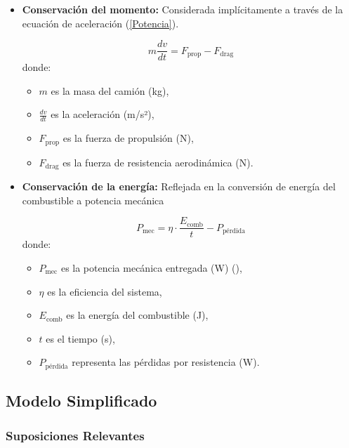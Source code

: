 \documentclass[11pt,stdletter,orderfromtodate,sigleft,twoside]{report}
\begin{document}
\begin{itemize}
    \item \textbf{Conservación del momento:} Considerada implícitamente a través de la ecuación de aceleración (\ref{Potencia}).

    \begin{equation*}
m \frac{dv}{dt} = F_{\text{prop}} - F_{\text{drag}}
\end{equation*}
donde:
\begin{itemize}
    \item \( m \) es la masa del camión (kg),
    \item \( \frac{dv}{dt} \) es la aceleración (m/s²),
    \item \( F_{\text{prop}} \) es la fuerza de propulsión (N),
    \item \( F_{\text{drag}} \) es la fuerza de resistencia aerodinámica (N).
\end{itemize}


    \item \textbf{Conservación de la energía:}  Reflejada en la conversión de energía del combustible a potencia mecánica

    \begin{equation*}
P_{\text{mec}} = \eta \cdot \frac{E_{\text{comb}}}{t} - P_{\text{pérdida}}
\end{equation*}
donde:
\begin{itemize}
    \item \( P_{\text{mec}} \) es la potencia mecánica entregada (W) (\cite{combustionEngine}),
    \item \( \eta \) es la eficiencia del sistema,
    \item \( E_{\text{comb}} \) es la energía del combustible (J),
    \item \( t \) es el tiempo (s),
    \item \( P_{\text{pérdida}} \) representa las pérdidas por resistencia (W).
\end{itemize}

\end{itemize}

\subsection{Modelo Simplificado}

\subsubsection{Suposiciones Relevantes}
\end{document}
